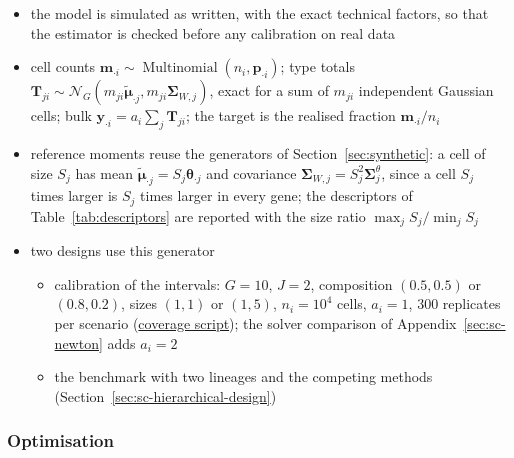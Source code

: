 \documentclass[pdflatex, sn-nature]{sn-jnl}
\theoremstyle{thmstyleone}%
\theoremstyle{thmstyletwo}%
\theoremstyle{thmstylethree}%
\newcommand{\repo}[2]{\href{https://github.com/bastienchassagnol/DeCovarT/#1}{#2}}
\begin{document}
\begin{itemize}
  \item the model is simulated as written, with the exact technical factors, so that the estimator is checked before
        any calibration on real data
  \item cell counts \(\boldsymbol{m}_{\cdot i}\sim\operatorname{Multinomial}(n_{i},\boldsymbol{p}_{\cdot i})\); type totals
        \(\boldsymbol{T}_{ji}\sim\mathcal{N}_{G}(m_{ji}\tilde{\boldsymbol{\mu}}_{\cdot j},m_{ji}\boldsymbol{\Sigma}_{W,j})\), exact for a sum of
        \(m_{ji}\) independent Gaussian cells; bulk \(\boldsymbol{y}_{\cdot i}=a_{i}\sum_{j}\boldsymbol{T}_{ji}\); the target is the
        realised fraction \(\boldsymbol{m}_{\cdot i}/n_{i}\)
  \item reference moments reuse the generators of Section~\ref{sec:synthetic}: a cell of size \(S_{j}\) has mean
        \(\tilde{\boldsymbol{\mu}}_{\cdot j}=S_{j}\boldsymbol{\theta}_{\cdot j}\) and covariance \(\boldsymbol{\Sigma}_{W,j}=S_{j}^{2}\boldsymbol{\Sigma}^{\theta}_{j}\), since a cell
        \(S_{j}\) times larger is \(S_{j}\) times larger in every gene; the descriptors of Table~\ref{tab:descriptors} are
        reported with the size ratio \(\max_{j}S_{j}/\min_{j}S_{j}\)
  \item two designs use this generator
  \begin{itemize}
    \item calibration of the intervals: \(G=10\), \(J=2\), composition \((0.5,0.5)\) or \((0.8,0.2)\), sizes \((1,1)\) or
          \((1,5)\), \(n_{i}=10^{4}\) cells, \(a_{i}=1\), 300 replicates per scenario
          (\repo{blob/main/scripts/benchmark_metrics/check_confidence_interval_coverage.R}{coverage script}); the
          solver comparison of Appendix~\ref{sec:sc-newton} adds \(a_{i}=2\)
    \item the benchmark with two lineages and the competing methods (Section~\ref{sec:sc-hierarchical-design})
  \end{itemize}
\end{itemize}

\subsubsection{Optimisation}
\label{sec:sc-optimisation}
\end{document}
